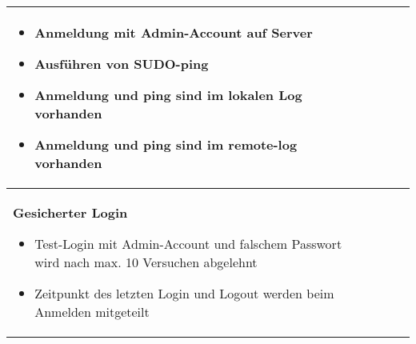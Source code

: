 \begin{longtable}{p{6.8cm}p{2.4cm}p{2.4cm}p{3cm}}
\begin{itemize}
\item
  Anmeldung mit Admin-Account auf Server
\item
  Ausführen von SUDO-ping
\item
  Anmeldung und ping sind im lokalen Log vorhanden
\item
  Anmeldung und ping sind im remote-log vorhanden
\end{itemize} & & & \\
\midrule
\textbf{Gesicherter Login}

\begin{itemize}
\item
  Test-Login mit Admin-Account und falschem Passwort wird nach max. 10
  Versuchen abgelehnt
\item
  Zeitpunkt des letzten Login und Logout werden beim Anmelden mitgeteilt
\end{itemize} & & & \\

\bottomrule
\end{longtable}
